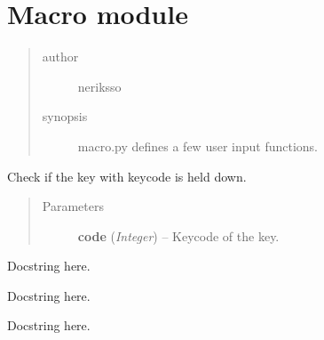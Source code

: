 \documentclass[letterpaper,10pt,english]{sphinxmanual}
\begin{document}
\section{Macro module}
\label{macro:macro-module}\label{macro:module-macro}\label{macro::doc}\begin{quote}\begin{description}
\item[{author}] \leavevmode
neriksso

\item[{synopsis}] \leavevmode
macro.py defines a few user input functions.

\end{description}\end{quote}

\begin{fulllineitems}
\label{macro:macro.GetKeydown}
Check if the key with keycode is held down.
\begin{quote}\begin{description}
\item[{Parameters}] \leavevmode
\textbf{code} (\emph{Integer}) -- Keycode of the key.

\end{description}\end{quote}

\end{fulllineitems}


\begin{fulllineitems}
\label{macro:macro.HardwareInput}
Docstring here.

\end{fulllineitems}


\begin{fulllineitems}
\label{macro:macro.Input}
Docstring here.

\end{fulllineitems}


\begin{fulllineitems}
\label{macro:macro.Input_I}
Docstring here.

\end{fulllineitems}
\end{document}

